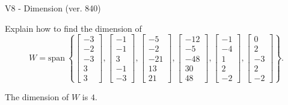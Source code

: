 \begin{exercise}
  \begin{exerciseTitle}V8 - Dimension (ver. 840)\end{exerciseTitle}
  \begin{exerciseStatement}
    Explain how to find the dimension of 
\[W=\mathrm{span}\ \left\{\left[\begin{array}{r}
-3 \\
-2 \\
-3 \\
3 \\
3
\end{array}\right] , \left[\begin{array}{r}
-1 \\
-1 \\
3 \\
-1 \\
-3
\end{array}\right] , \left[\begin{array}{r}
-5 \\
-2 \\
-21 \\
13 \\
21
\end{array}\right] , \left[\begin{array}{r}
-12 \\
-5 \\
-48 \\
30 \\
48
\end{array}\right] , \left[\begin{array}{r}
-1 \\
-4 \\
1 \\
2 \\
-2
\end{array}\right] , \left[\begin{array}{r}
0 \\
2 \\
-3 \\
2 \\
-2
\end{array}\right]\right\}.\]



  \end{exerciseStatement}
  \begin{exerciseAnswer}
   The dimension of \(W\) is  \(4\).
  


  \end{exerciseAnswer}
\end{exercise}